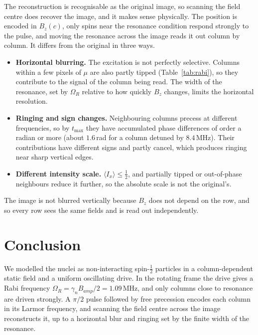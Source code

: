 \documentclass{article}
\newcommand{\MHz}{\,\mathrm{MHz}}
\newcommand{\av}[1]{\langle #1\rangle}
\newcommand{\OmR}{\Omega_R}
\begin{document}
The reconstruction is recognisable as the original image, so scanning the field centre does recover the image, and it makes sense physically. The position is encoded in $B_z(c)$, only spins near the resonance condition respond strongly to the pulse, and moving the resonance across the image reads it out column by column. It differs from the original in three ways.
\begin{itemize}
  \item \textbf{Horizontal blurring.} The excitation is not perfectly selective.
        Columns within a few pixels of $\mu$ are also partly tipped
        (Table~\ref{tab:rabi}), so they contribute to the signal of the column
        being read. The width of the resonance, set by $\OmR$ relative to how
        quickly $B_z$ changes, limits the horizontal resolution.
  \item \textbf{Ringing and sign changes.} Neighbouring columns precess at
        different frequencies, so by $t_{\max}$ they have accumulated phase
        differences of order a radian or more (about $1.6$\,rad for a column
        detuned by $8.4\MHz$). Their contributions have different signs and
        partly cancel, which produces ringing near sharp vertical edges.
  \item \textbf{Different intensity scale.} $\av{I_x}\le\tfrac12$, and partially
        tipped or out-of-phase neighbours reduce it further, so the absolute
        scale is not the original's.
\end{itemize}
The image is not blurred vertically because $B_z$ does not depend on the row, and so every row sees the same fields and is read out independently.

\section{Conclusion}
We modelled the nuclei as non-interacting spin-$\frac{1}{2}$ particles in a column-dependent static field and a uniform oscillating drive. In the rotating frame the drive gives a Rabi frequency $\OmR=\gamma _nB_{amp}/2=1.09\MHz$, and only columns close to resonance are driven strongly. A $\pi /2$ pulse followed by free precession encodes each column in its Larmor frequency, and scanning the field centre across the image reconstructs it, up to a horizontal blur and ringing set by the finite width of the resonance.
\end{document}
